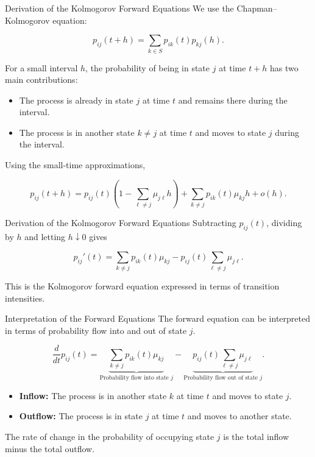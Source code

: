 \documentclass[
  ignorenonframetext,
  aspectratio=169,
]{beamer}
\providecommand{\tightlist}{%
  \setlength{\itemsep}{0pt}\setlength{\parskip}{0pt}}
\begin{document}
\begin{frame}{Derivation of the Kolmogorov Forward Equations}
\protect{}\label{derivation-of-the-kolmogorov-forward-equations}
We use the Chapman--Kolmogorov equation:

\[
p_{ij}(t+h)=\sum_{k\in S}p_{ik}(t)p_{kj}(h).
\]

For a small interval \(h\), the probability of being in state \(j\) at
time \(t+h\) has two main contributions:

\begin{itemize}
\tightlist
\item
  The process is already in state \(j\) at time \(t\) and remains there
  during the interval.
\item
  The process is in another state \(k\neq j\) at time \(t\) and moves to
  state \(j\) during the interval.
\end{itemize}

Using the small-time approximations,

\[
p_{ij}(t+h)=p_{ij}(t)\left(1-\sum_{\ell\neq j}\mu_{j\ell}h\right)+\sum_{k\neq j}p_{ik}(t)\mu_{kj}h+o(h).
\]
\end{frame}

\begin{frame}{Derivation of the Kolmogorov Forward Equations}
\protect{}\label{derivation-of-the-kolmogorov-forward-equations-1}
Subtracting \(p_{ij}(t)\), dividing by \(h\) and letting
\(h\downarrow 0\) gives

\[
\boxed{
p_{ij}'(t)
=
\sum_{k\neq j}p_{ik}(t)\mu_{kj}
-
p_{ij}(t)\sum_{\ell\neq j}\mu_{j\ell}.
}
\]

This is the Kolmogorov forward equation expressed in terms of transition
intensities.
\end{frame}

\begin{frame}{Interpretation of the Forward Equations}
\protect{}\label{interpretation-of-the-forward-equations}
The forward equation can be interpreted in terms of probability flow
into and out of state \(j\).

\[
\frac{d}{dt}p_{ij}(t)
=
\underbrace{\sum_{k\neq j}p_{ik}(t)\mu_{kj}}_{\text{Probability flow into state }j}
-
\underbrace{p_{ij}(t)\sum_{\ell\neq j}\mu_{j\ell}}_{\text{Probability flow out of state }j}.
\]

\begin{itemize}
\tightlist
\item
  \textbf{Inflow:} The process is in another state \(k\) at time \(t\)
  and moves to state \(j\).
\item
  \textbf{Outflow:} The process is in state \(j\) at time \(t\) and
  moves to another state.
\end{itemize}

The rate of change in the probability of occupying state \(j\) is the
total inflow minus the total outflow.
\end{frame}
\end{document}
